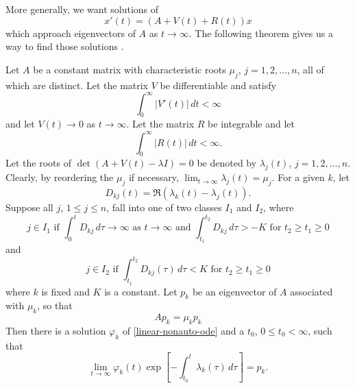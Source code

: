 More generally, we want solutions of
\begin{equation}\label{linear-nonauto-ode}
	x'(t) = (A+ V(t) + R(t))x
\end{equation}
which approach eigenvectors of \(A\) as \(t\to \infty\). The following theorem gives us a way to find those solutions \cite[Chp.~3, Thm.~8.1]{coddington1955theory}.
\begin{theorem}
	Let \(A\) be a constant matrix with characteristic roots \(\mu_j\), \(j=1,2,\ldots, n\), all of which are distinct. Let the matrix \(V\) be differentiable and satisfy
	\begin{equation}
		\int_0^\infty |V'(t)|\, dt < \infty
	\end{equation}
	and let \(V(t) \to 0\) as \(t\to\infty\). Let the matrix \(R\) be integrable and let 
	\begin{equation}
		\int_0^\infty |R(t)|\, dt < \infty.
	\end{equation}
	Let the roots of \(\det(A+V(t) -\lambda I) = 0\) be denoted by \(\lambda_j(t)\), \(j = 1,2 ,\ldots, n\). Clearly, by reordering the \(\mu_j\) if necessary, \(\lim_{t\to\infty} \lambda_j(t) = \mu_j\). For a given \(k\), let 
	\begin{equation}
		D_{kj}(t) = \Re(\lambda_k(t) - \lambda_j(t)).
	\end{equation}
	Suppose all \(j\), \(1\leq j \leq n\), fall into one of two classes \(I_1\) and \(I_2\), where
	\begin{equation}
		j \in I_1 \text{ if } \int_0^t D_{kj}\, d\tau \to \infty \text{ as } t\to\infty \text{ and } \int_{t_1}^{t_2} D_{kj}\, d\tau > -K \text{ for }t_2\geq t_1 \geq 0
	\end{equation}
	and 
	\begin{equation}
		j \in I_2 \text{ if } \int_{t_1}^{t_2} D_{kj}(\tau) \, d\tau  < K \text{ for } t_2\geq t_1\geq 0
	\end{equation}
	where \(k\) is fixed and \(K\) is a constant. Let \(p_k\) be an eigenvector of \(A\) associated with \(\mu_k\), so that 
	\begin{equation}
		Ap_k = \mu_k p_k
	\end{equation}
	Then there is a solution \(\varphi_k\) of \cref{linear-nonauto-ode} and a \(t_0\), \(0\leq t_0< \infty\), such that
	\begin{equation}
		\lim_{t\to\infty} \varphi_k(t) \exp\left[ - \int_{t_0}^ t \lambda_k(\tau) \, d\tau \right] = p_k.
	\end{equation}
\end{theorem}

